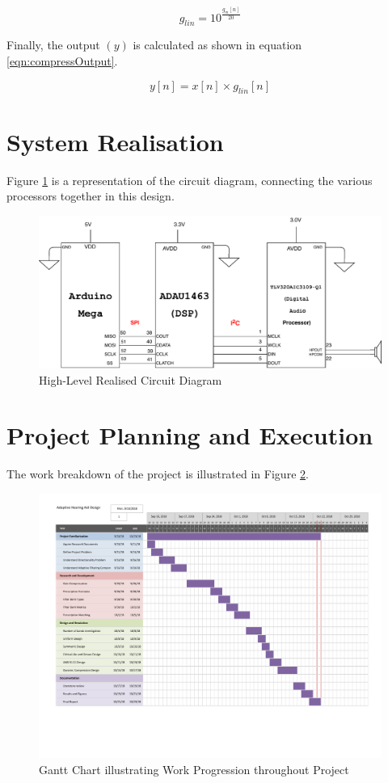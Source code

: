 \documentclass[11pt,onecolumn]{witseiepaper}
\begin{document}
\begin{appendices}
\begin{equation}
\label{eqn:glin}
g_{lin} = 10^{\frac{g_m[n]}{20}}
\end{equation}

\noindent Finally, the output $(y)$ is calculated as shown in equation \ref{eqn:compressOutput}.

\begin{equation}
\label{eqn:compressOutput}
y[n] = x[n] \times g_{lin}[n]
\end{equation}


\section{System Realisation}
\label{app:cct}

\noindent Figure \ref{fig:cct} is a representation of the circuit diagram, connecting the various processors together in this design.


\begin{figure}[h]
\centering
\includegraphics[width=0.6\linewidth]{cct.pdf}
\caption{High-Level Realised Circuit Diagram}
\label{fig:cct}
\end{figure}

\section{Project Planning and Execution}

\noindent The work breakdown of the project is illustrated in Figure \ref{fig:gantt}.

\begin{figure}[h]
\centering
\includegraphics[width=\linewidth]{gantt.pdf}
\caption{Gantt Chart illustrating Work Progression throughout Project}
\label{fig:gantt}
\end{figure} 


\end{appendices}
\end{document}
